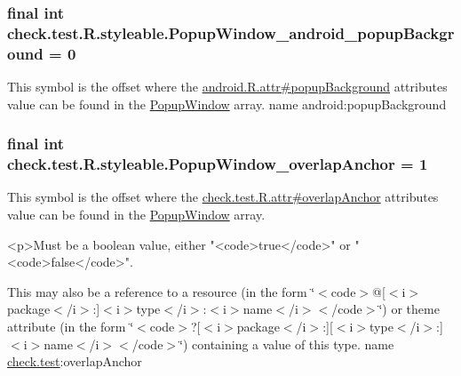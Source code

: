 \subsubsection[{Popup\+Window\+\_\+android\+\_\+popup\+Background}]{\setlength{\rightskip}{0pt plus 5cm}final int check.\+test.\+R.\+styleable.\+Popup\+Window\+\_\+android\+\_\+popup\+Background = 0\hspace{0.3cm}{\ttfamily [static]}}\label{classcheck_1_1test_1_1_r_1_1styleable_ad1f620b82190cd4dec8ccbeb3d2904c7}
This symbol is the offset where the \hyperlink{}{android.\+R.\+attr\#popup\+Background} attribute\textquotesingle{}s value can be found in the \hyperlink{classcheck_1_1test_1_1_r_1_1styleable_a288d8e82cd6f78d38522b3bd6c8acc55}{Popup\+Window} array.  name android\+:popup\+Background \hypertarget{classcheck_1_1test_1_1_r_1_1styleable_aeff228e6915165337ceeae75105f3722}{}
\subsubsection[{Popup\+Window\+\_\+overlap\+Anchor}]{\setlength{\rightskip}{0pt plus 5cm}final int check.\+test.\+R.\+styleable.\+Popup\+Window\+\_\+overlap\+Anchor = 1\hspace{0.3cm}{\ttfamily [static]}}\label{classcheck_1_1test_1_1_r_1_1styleable_aeff228e6915165337ceeae75105f3722}
This symbol is the offset where the \hyperlink{classcheck_1_1test_1_1_r_1_1attr_a0ff108aa79d1ca5503c46fa0b941870e}{check.\+test.\+R.\+attr\#overlap\+Anchor} attribute\textquotesingle{}s value can be found in the \hyperlink{classcheck_1_1test_1_1_r_1_1styleable_a288d8e82cd6f78d38522b3bd6c8acc55}{Popup\+Window} array.

\begin{DoxyVerb}      <p>Must be a boolean value, either "<code>true</code>" or "<code>false</code>".
\end{DoxyVerb}
 

This may also be a reference to a resource (in the form \char`\"{}$<$code$>$@\mbox{[}$<$i$>$package$<$/i$>$\+:\mbox{]}$<$i$>$type$<$/i$>$\+:$<$i$>$name$<$/i$>$$<$/code$>$\char`\"{}) or theme attribute (in the form \char`\"{}$<$code$>$?\mbox{[}$<$i$>$package$<$/i$>$\+:\mbox{]}\mbox{[}$<$i$>$type$<$/i$>$\+:\mbox{]}$<$i$>$name$<$/i$>$$<$/code$>$\char`\"{}) containing a value of this type.  name \hyperlink{namespacecheck_1_1test}{check.\+test}\+:overlap\+Anchor \hypertarget{classcheck_1_1test_1_1_r_1_1styleable_a63af2b96a7d723f1c8f7cc45982e2b8a}{}
